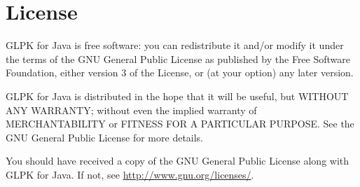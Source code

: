 \documentclass[a4paper,11pt]{report}
\begin{document}
\chapter{License}
GLPK for Java is free software: you can redistribute it and/or 
modify it under the terms of the GNU General Public License\cite{GPL} as
published by the Free Software Foundation, either version 3 of the
License, or (at your option) any later version.

GLPK for Java is distributed in the hope that it will be useful, but 
WITHOUT ANY WARRANTY; without even the implied warranty of 
MERCHANTABILITY or FITNESS FOR A PARTICULAR PURPOSE. See the GNU 
General Public License for more details.

You should have received a copy of the GNU General Public License
along with GLPK for Java. If not, see 
\href{http://www.gnu.org/licenses/}{http://www.gnu.org/licenses/}.



\newpage
\printindex
\end{document}
